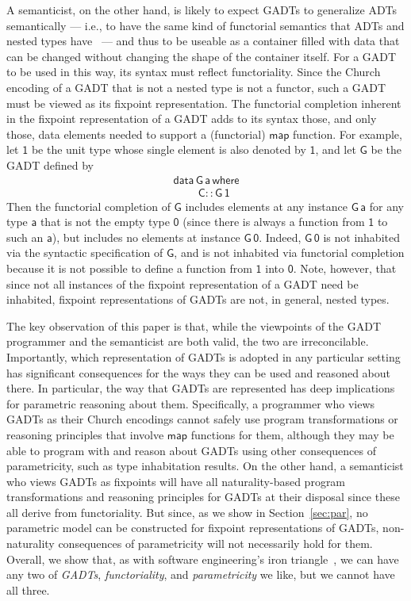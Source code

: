 \documentclass[submission,copyright,creativecommons]{eptcs}
\begin{document}
A semanticist, on the other hand, is likely to expect GADTs to
generalize ADTs semantically --- i.e., to have the same kind of
functorial semantics that ADTs and nested types
have~\cite{bm98,jg07,jp19} --- and thus to be useable as a container
filled with data that can be changed without changing the shape of the
container itself.  For a GADT to be used in this way, its syntax must
reflect functoriality. Since the Church encoding of a GADT that is not
a nested type is not a functor, such a GADT must be viewed as its
fixpoint representation. The functorial completion inherent in the
fixpoint representation of a GADT adds to its syntax those, and only
those, data elements needed to support a (functorial) $\mathsf{map}$
function.  For example, let $\mathsf{1}$ be the unit type whose single
element is also denoted by $\mathsf{1}$, and let $\mathsf{G}$ be the
GADT defined by
\begin{equation}\label{eq:G}
\begin{array}{l}
\mathsf{data\,G\,a\,where}\\
\mathsf{\;\;\;\;\;\;\;\;C :: G\,1}
\end{array}
\end{equation}
Then the functorial completion of $\mathsf{G}$ includes elements at
any instance $\mathsf{G\,a}$ for any type $\mathsf{a}$ that is not the
empty type $\mathsf{0}$ (since there is always a function from
$\mathsf{1}$ to such an $\mathsf{a}$), but includes no elements at
instance $\mathsf{G\,0}$. Indeed, $\mathsf{G\,0}$ is not inhabited via
the syntactic specification of $\mathsf{G}$, and is not inhabited via
functorial completion because it is not possible to define a function
from $\mathsf{1}$ into $\mathsf{0}$. Note, however, that since not all
instances of the fixpoint representation of a GADT need be inhabited,
fixpoint representations of GADTs are not, in general, nested types.

The key observation of this paper is that, while the viewpoints of the
GADT programmer and the semanticist are both valid, the two are
irreconcilable. Importantly, which representation of GADTs is adopted
in any particular setting has significant consequences for the ways
they can be used and reasoned about there. In particular, the way that
GADTs are represented has deep implications for parametric reasoning
about them. Specifically, a programmer who views GADTs as their Church
encodings cannot safely use program transformations or reasoning
principles that involve $\mathsf{map}$ functions for them, although
they may be able to program with and reason about GADTs using other
consequences of parametricity, such as type inhabitation results. On
the other hand, a semanticist who views GADTs as fixpoints will have
all naturality-based program transformations and reasoning principles
for GADTs at their disposal since these all derive from
functoriality. But since, as we show in Section~\ref{sec:par}, no
parametric model can be constructed for fixpoint representations of
GADTs, non-naturality consequences of parametricity will not
necessarily hold for them.  Overall, we show that, as with software
engineering's iron triangle~\cite{iron-triangle}, we can have any two
of {\em GADTs}, {\em functoriality}, and {\em parametricity} we like,
but we cannot have all three.
\end{document}
